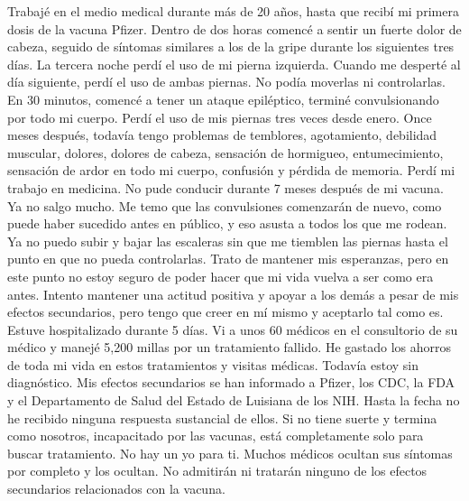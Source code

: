 Trabajé en el medio medical durante más de 20 años, hasta que recibí mi primera
dosis de la vacuna Pfizer. Dentro de dos horas comencé a sentir un fuerte dolor
de cabeza, seguido de síntomas similares a los de la gripe durante los
siguientes tres días. La tercera noche perdí el uso de mi pierna
izquierda. Cuando me desperté al día siguiente, perdí el uso de ambas
piernas. No podía moverlas ni controlarlas. En 30 minutos, comencé a tener un
ataque epiléptico, terminé convulsionando por todo mi cuerpo. Perdí el uso de
mis piernas tres veces desde enero. Once meses después, todavía tengo problemas
de temblores, agotamiento, debilidad muscular, dolores, dolores de cabeza,
sensación de hormigueo, entumecimiento, sensación de ardor en todo mi cuerpo,
confusión y pérdida de memoria. Perdí mi trabajo en medicina. No pude conducir
durante 7 meses después de mi vacuna. Ya no salgo mucho. Me temo que las
convulsiones comenzarán de nuevo, como puede haber sucedido antes en público, y
eso asusta a todos los que me rodean. Ya no puedo subir y bajar las escaleras
sin que me tiemblen las piernas hasta el punto en que no pueda
controlarlas. Trato de mantener mis esperanzas, pero en este punto no estoy
seguro de poder hacer que mi vida vuelva a ser como era antes. Intento mantener
una actitud positiva y apoyar a los demás a pesar de mis efectos secundarios,
pero tengo que creer en mí mismo y aceptarlo tal como es. Estuve hospitalizado
durante 5 días. Vi a unos 60 médicos en el consultorio de su médico y manejé
5,200 millas por un tratamiento fallido. He gastado los ahorros de toda mi vida
en estos tratamientos y visitas médicas. Todavía estoy sin diagnóstico. Mis
efectos secundarios se han informado a Pfizer, los CDC, la FDA y el Departamento
de Salud del Estado de Luisiana de los NIH. Hasta la fecha no he recibido
ninguna respuesta sustancial de ellos. Si no tiene suerte y termina como
nosotros, incapacitado por las vacunas, está completamente solo para buscar
tratamiento. No hay un yo para ti. Muchos médicos ocultan sus síntomas por
completo y los ocultan. No admitirán ni tratarán ninguno de los efectos
secundarios relacionados con la vacuna.

